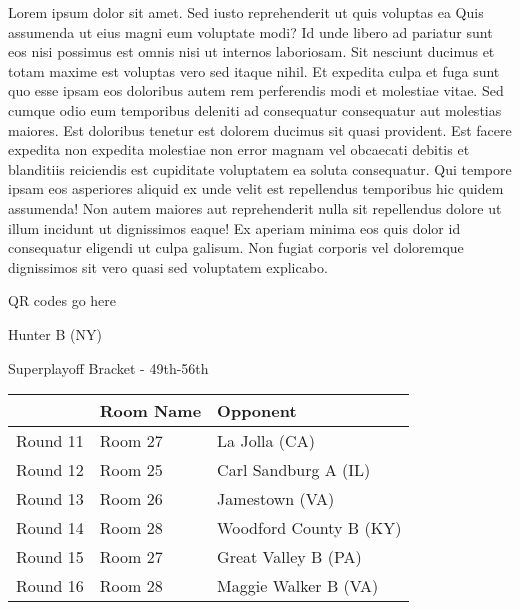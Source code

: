 \documentclass{article}%
\begin{document}
\vspace*{8pt}%
\linebreak%
\newline%
\newline%
    Lorem ipsum dolor sit amet. Sed iusto reprehenderit ut quis voluptas ea Quis assumenda ut eius magni eum voluptate modi? Id unde libero ad pariatur sunt eos nisi possimus est omnis nisi ut internos laboriosam. Sit nesciunt ducimus et totam maxime est voluptas vero sed itaque nihil. Et expedita culpa et fuga sunt quo esse ipsam eos doloribus autem rem perferendis modi et molestiae vitae.\newline%
\newline%
    Sed cumque odio eum temporibus deleniti ad consequatur consequatur aut molestias maiores. Est doloribus tenetur est dolorem ducimus sit quasi provident. Est facere expedita non expedita molestiae non error magnam vel obcaecati debitis et blanditiis reiciendis est cupiditate voluptatem ea soluta consequatur. Qui tempore ipsam eos asperiores aliquid ex unde velit est repellendus temporibus hic quidem assumenda!\newline%
\newline%
    Non autem maiores aut reprehenderit nulla sit repellendus dolore ut illum incidunt ut dignissimos eaque! Ex aperiam minima eos quis dolor id consequatur eligendi ut culpa galisum. Non fugiat corporis vel doloremque dignissimos sit vero quasi sed voluptatem explicabo.\newline%
\newline%
\vspace*{30pt}%
\begin{center}%
\begin{Huge}%
QR codes go here%
\end{Huge}%
\end{center}%
\newpage%
\begin{center}%
\begin{Huge}%
Hunter B (NY)%
\end{Huge}%
\vspace*{8pt}%
\linebreak%
\begin{Large}%
Superplayoff Bracket {-} 49th{-}56th%
\end{Large}%
\end{center}%
%
\begin{tabularx}{\textwidth}{|c|Y|Y|}%
\hline%
&Room Name&Opponent\\%
\hline%
Round 11&Room 27&La Jolla (CA)\\%
Round 12&Room 25&Carl Sandburg A (IL)\\%
Round 13&Room 26&Jamestown (VA)\\%
Round 14&Room 28&Woodford County B (KY)\\%
Round 15&Room 27&Great Valley B (PA)\\%
Round 16&Room 28&Maggie Walker B (VA)\\%
\hline%
\end{tabularx}%
\end{document}
